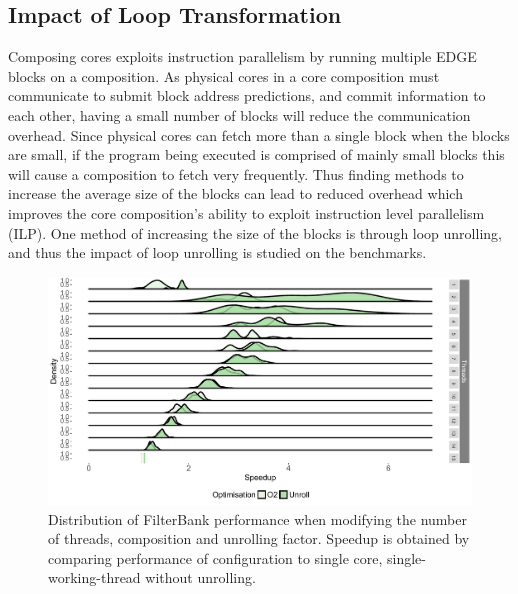 \subsection{Impact of Loop Transformation}
Composing cores exploits instruction parallelism by running multiple EDGE blocks on a composition.
As physical cores in a core composition must communicate to submit block address predictions, and commit information to each other, having a small number of blocks will reduce the communication overhead.
Since physical cores can fetch more than a single block when the blocks are small, if the program being executed is comprised of mainly small blocks this will cause a composition to fetch very frequently.
Thus finding methods to increase the average size of the blocks can lead to reduced overhead which improves the core composition's ability to exploit instruction level parallelism (ILP).
One method of increasing the size of the blocks is through loop unrolling, and thus the impact of loop unrolling is studied on the benchmarks.

\begin{figure}[t]
  \includegraphics[width=1\textwidth]{streamit-paper/graphics/filterbank_unroll2.pdf}
  \vspace{-1em}
  \caption{Distribution of FilterBank performance when modifying the number of threads, composition and unrolling factor. Speedup is obtained by comparing performance of configuration to single core, single-working-thread without unrolling.}\label{fig:fbunroll}  \vspace{-1em}

\end{figure}

